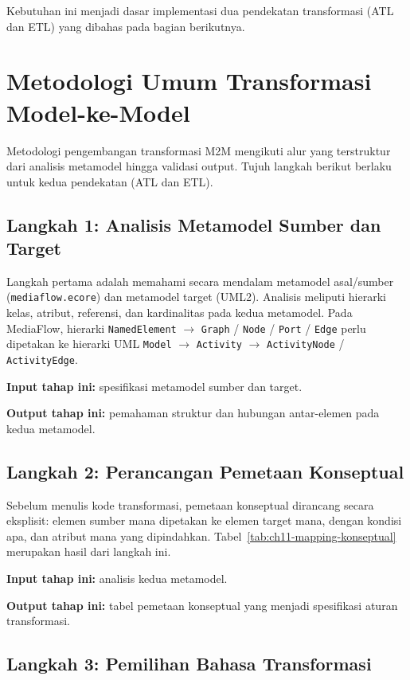 Kebutuhan ini menjadi dasar implementasi dua pendekatan transformasi (ATL dan ETL) yang dibahas pada bagian berikutnya.

\section{Metodologi Umum Transformasi Model-ke-Model}

Metodologi pengembangan transformasi M2M mengikuti alur yang terstruktur dari analisis metamodel hingga validasi output. Tujuh langkah berikut berlaku untuk kedua pendekatan (ATL dan ETL).

\subsection{Langkah 1: Analisis Metamodel Sumber dan Target}

Langkah pertama adalah memahami secara mendalam metamodel asal/sumber (\texttt{mediaflow.ecore}) dan metamodel target (UML2). Analisis meliputi hierarki kelas, atribut, referensi, dan kardinalitas pada kedua metamodel. Pada MediaFlow, hierarki \texttt{NamedElement} $\rightarrow$ \texttt{Graph} / \texttt{Node} / \texttt{Port} / \texttt{Edge} perlu dipetakan ke hierarki UML \texttt{Model} $\rightarrow$ \texttt{Activity} $\rightarrow$ \texttt{ActivityNode} / \texttt{ActivityEdge}.

\textbf{Input tahap ini:} spesifikasi metamodel sumber dan target.

\textbf{Output tahap ini:} pemahaman struktur dan hubungan antar-elemen pada kedua metamodel.

\subsection{Langkah 2: Perancangan Pemetaan Konseptual}

Sebelum menulis kode transformasi, pemetaan konseptual dirancang secara eksplisit: elemen sumber mana dipetakan ke elemen target mana, dengan kondisi apa, dan atribut mana yang dipindahkan. Tabel~\ref{tab:ch11-mapping-konseptual} merupakan hasil dari langkah ini.

\textbf{Input tahap ini:} analisis kedua metamodel.

\textbf{Output tahap ini:} tabel pemetaan konseptual yang menjadi spesifikasi aturan transformasi.

\subsection{Langkah 3: Pemilihan Bahasa Transformasi}

